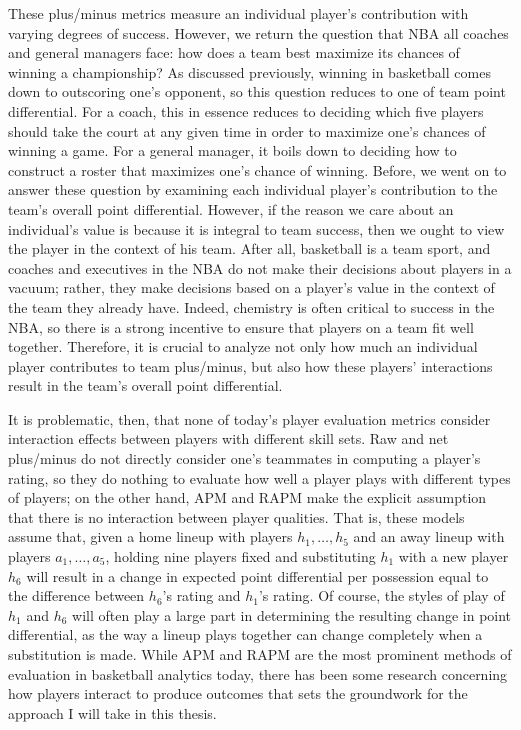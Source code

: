 These plus/minus metrics measure an individual player's contribution with varying
degrees of success. However, we return the question that NBA all coaches and general
managers face: how does a team best maximize its chances of winning a championship?
As discussed previously, winning in basketball comes down to outscoring one's
opponent, so this question reduces to one of team point differential. For a coach,
this in essence reduces to deciding which five players should take the court at any
given time in order to maximize one's chances of winning a game. For a general
manager, it boils down to deciding how to construct a roster that maximizes one's
chance of winning. Before, we went on to answer these question by examining each
individual player's contribution to the team's overall point differential. However,
if the reason we care about an individual's value is because it is integral to team
success, then we ought to view the player in the context of his team. After all,
basketball is a team sport, and coaches and executives in the NBA do not make their
decisions about players in a vacuum; rather, they make decisions based on a player’s
value in the context of the team they already have. Indeed, chemistry is often
critical to success in the NBA, so there is a strong incentive to ensure that
players on a team fit well together. Therefore, it is crucial to analyze not only
how much an individual player contributes to team plus/minus, but also how these
players' interactions result in the team's overall point differential.

It is problematic, then, that none of today's player evaluation metrics consider
interaction effects between players with different skill sets. Raw and net
plus/minus do not directly consider one's teammates in computing a player's rating,
so they do nothing to evaluate how well a player plays with different types of
players; on the other hand, APM and RAPM make the explicit assumption that there is
no interaction between player qualities. That is, these models assume that, given a
home lineup with players $h_1, \dots, h_5$ and an away lineup with players $a_1,
\dots, a_5$, holding nine players fixed and substituting $h_1$ with a new player
$h_6$ will result in a change in expected point differential per possession equal to
the difference between $h_6$'s rating and $h_1$'s rating. Of course, the styles of
play of $h_1$ and $h_6$ will often play a large part in determining the resulting
change in point differential, as the way a lineup plays together can change
completely when a substitution is made. While APM and RAPM are the most prominent
methods of evaluation in basketball analytics today, there has been some research
concerning how players interact to produce outcomes that sets the groundwork for the
approach I will take in this thesis.

